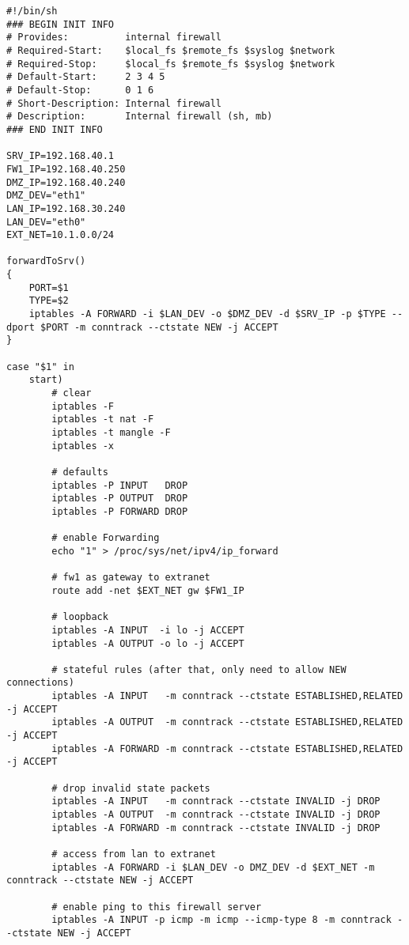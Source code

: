 \begin{lstlisting}[label=lst:masq,caption={Basisskript interne Firewall.}]
#!/bin/sh
### BEGIN INIT INFO
# Provides:          internal firewall
# Required-Start:    $local_fs $remote_fs $syslog $network
# Required-Stop:     $local_fs $remote_fs $syslog $network
# Default-Start:     2 3 4 5
# Default-Stop:      0 1 6
# Short-Description: Internal firewall
# Description:       Internal firewall (sh, mb)
### END INIT INFO

SRV_IP=192.168.40.1
FW1_IP=192.168.40.250
DMZ_IP=192.168.40.240
DMZ_DEV="eth1"
LAN_IP=192.168.30.240
LAN_DEV="eth0"
EXT_NET=10.1.0.0/24

forwardToSrv()
{
    PORT=$1
    TYPE=$2
    iptables -A FORWARD -i $LAN_DEV -o $DMZ_DEV -d $SRV_IP -p $TYPE --dport $PORT -m conntrack --ctstate NEW -j ACCEPT
}

case "$1" in
    start)
        # clear
        iptables -F
        iptables -t nat -F
        iptables -t mangle -F
        iptables -x

        # defaults
        iptables -P INPUT   DROP
        iptables -P OUTPUT  DROP
        iptables -P FORWARD DROP

        # enable Forwarding
        echo "1" > /proc/sys/net/ipv4/ip_forward

        # fw1 as gateway to extranet
        route add -net $EXT_NET gw $FW1_IP

        # loopback
        iptables -A INPUT  -i lo -j ACCEPT
        iptables -A OUTPUT -o lo -j ACCEPT

        # stateful rules (after that, only need to allow NEW connections)
        iptables -A INPUT   -m conntrack --ctstate ESTABLISHED,RELATED -j ACCEPT
        iptables -A OUTPUT  -m conntrack --ctstate ESTABLISHED,RELATED -j ACCEPT
        iptables -A FORWARD -m conntrack --ctstate ESTABLISHED,RELATED -j ACCEPT

        # drop invalid state packets
        iptables -A INPUT   -m conntrack --ctstate INVALID -j DROP
        iptables -A OUTPUT  -m conntrack --ctstate INVALID -j DROP
        iptables -A FORWARD -m conntrack --ctstate INVALID -j DROP

        # access from lan to extranet
        iptables -A FORWARD -i $LAN_DEV -o DMZ_DEV -d $EXT_NET -m conntrack --ctstate NEW -j ACCEPT

        # enable ping to this firewall server
        iptables -A INPUT -p icmp -m icmp --icmp-type 8 -m conntrack --ctstate NEW -j ACCEPT


\end{lstlisting}
